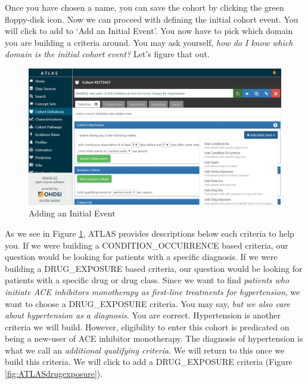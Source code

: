 \documentclass[11pt]{book}
\theoremstyle{definition}
\theoremstyle{definition}
\theoremstyle{definition}
\theoremstyle{remark}
\begin{document}
Once you have chosen a name, you can save the cohort by clicking the green floppy-disk icon. Now we can proceed with defining the initial cohort event. You will click to add to `Add an Initial Event'. You now have to pick which domain you are building a criteria around. You may ask yourself, \emph{how do I know which domain is the initial cohort event?} Let's figure that out.

\begin{figure}

{\centering \includegraphics[width=0.9\linewidth]{images/Cohorts/ATLAS-initialevent} 

}

\caption{Adding an Initial Event}\label{fig:ATLASinitialevent}
\end{figure}

As we see in Figure \ref{fig:ATLASinitialevent}, ATLAS provides descriptions below each criteria to help you. If we were building a CONDITION\_OCCURRENCE based criteria, our question would be looking for patients with a specific diagnosis. If we were building a DRUG\_EXPOSURE based criteria, our question would be looking for patients with a specific drug or drug class. Since we want to find \emph{patients who initiate ACE inhibitors monotherapy as first-line treatments for hypertension}, we want to choose a DRUG\_EXPOSURE criteria. You may say, \emph{but we also care about hypertension as a diagnosis}. You are correct. Hypertension is another criteria we will build. However, eligibility to enter this cohort is predicated on being a new-user of ACE inhibitor monotherapy. The diagnosis of hypertension is what we call an \emph{additional qualifying criteria}. We will return to this once we build this criteria. We will click to add a DRUG\_EXPOSURE criteria (Figure \ref{fig:ATLASdrugexposure}).
\end{document}
